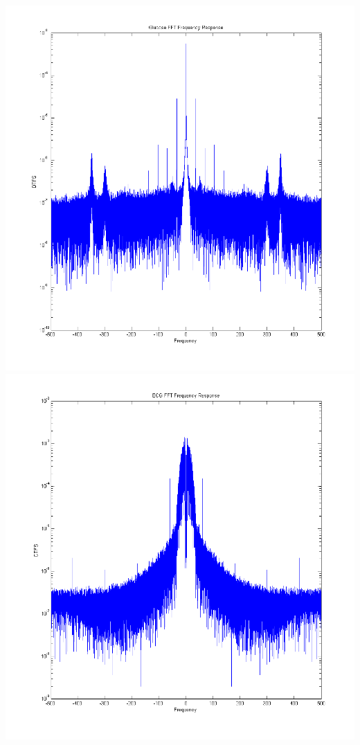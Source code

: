 \documentclass{article}
\begin{document}
\begin{enumerate}
\begin{enumerate}
	\includegraphics[width=\linewidth/2]{../images/P1_GlucoseFFT} \includegraphics[width=\linewidth/2]{../images/P1_ECGFFT}\\
 

\end{enumerate}
\end{enumerate}
\end{document}

